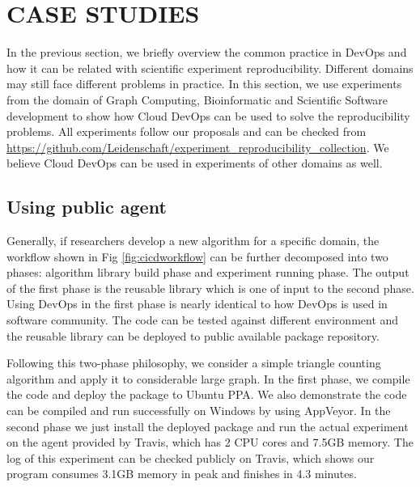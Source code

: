 \documentclass[10pt, conference, compsocconf]{IEEEtran}
\begin{document}
\section{CASE STUDIES}
In the previous section, we briefly overview the common practice in DevOps and how it can be related with scientific experiment reproducibility. Different domains may still face different problems in practice. In this section, we use experiments from the domain of Graph Computing, Bioinformatic and Scientific Software development to show how Cloud DevOps can be used to solve the reproducibility problems. All experiments follow our proposals and can be checked from \url{https://github.com/Leidenschaft/experiment_reproducibility_collection}. We believe Cloud DevOps can be used in experiments of other domains as well. 

\subsection{Using public agent}
Generally, if researchers develop a new algorithm for a specific domain, the workflow shown in Fig \ref{fig:cicdworkflow} can be further decomposed into two phases:
algorithm library build phase and experiment running phase. The output of the first phase is the reusable library which is one of input to the second phase. Using DevOps in the first phase is nearly identical to how DevOps is used in software community.  The code can be tested against different environment and 
the reusable library can be deployed to public available package repository.
 
Following this two-phase philosophy, we consider a simple triangle counting algorithm and apply it to considerable large graph. %
In the first phase, we compile the code and deploy the package to Ubuntu PPA. We also demonstrate the code can be compiled and run successfully on Windows by using AppVeyor. In the second phase we just install the deployed package and run the actual experiment on the agent provided by Travis, which has 2 CPU cores and 7.5GB memory. The log of this experiment can be checked publicly on Travis, which shows
our program consumes 3.1GB memory in peak and finishes in 4.3 minutes. 
\end{document}

